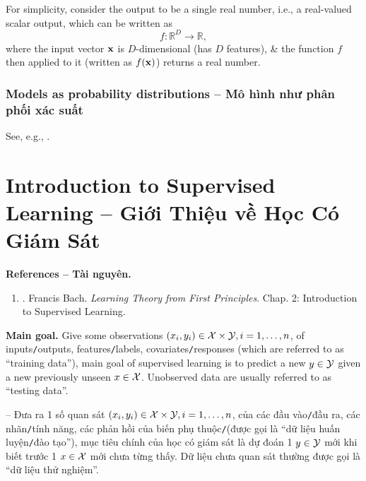 \documentclass{article}
\begin{document}
For simplicity, consider the output to be a single real number, i.e., a real-valued scalar output, which can be written as
\begin{equation*}
	f:\mathbb{R}^D\to\mathbb{R},
\end{equation*}
where the input vector ${\bf x}$ is $D$-dimensional (has $D$ features), \& the function $f$ then applied to it (written as $f({\bf x})$) returns a real number.

\subsubsection{Models as probability distributions -- Mô hình như phân phối xác suất}
See, e.g., \cite[Chap. 8, Sect. 8.1.3: Models as Probability Distributions]{Deisenroth_Faisal_Ong2024}.

\section{Introduction to Supervised Learning -- Giới Thiệu về Học Có Giám Sát}
\textbf{\textsf{References -- Tài nguyên.}}
\begin{enumerate}
	\item \cite{Bach2024}. {\sc Francis Bach}. {\it Learning Theory from First Principles}. Chap. 2: Introduction to Supervised Learning.
\end{enumerate}
{\bf Main goal.} Give some observations $(x_i,y_i)\in{\cal X}\times{\cal Y},i = 1,\ldots,n$, of inputs{\tt/}outputs, features{\tt/}labels, covariates{\tt/}responses (which are referred to as ``training data''), main goal of supervised learning is to predict a new $y\in{\cal Y}$ given a new previously unseen $x\in{\cal X}$. Unobserved data are usually referred to as ``testing data''.

-- Đưa ra 1 số quan sát $(x_i,y_i)\in{\cal X}\times{\cal Y},i = 1,\ldots,n$, của các đầu vào{\tt/}đầu ra, các nhãn{\tt/}tính năng, các phản hồi của biến phụ thuộc{\tt/}(được gọi là ``dữ liệu huấn luyện{\tt/}đào tạo''), mục tiêu chính của học có giám sát là dự đoán 1 $y\in{\cal Y}$ mới khi biết trước 1 $x\in{\cal X}$ mới chưa từng thấy. Dữ liệu chưa quan sát thường được gọi là ``dữ liệu thử nghiệm''.
\end{document}
